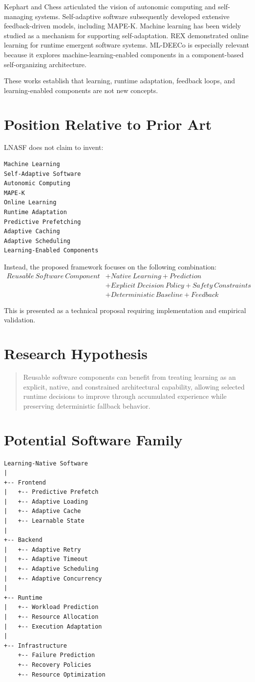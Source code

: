\documentclass[11pt,a4paper]{article}
\begin{document}
Kephart and Chess articulated the vision of autonomic computing and self-managing systems. Self-adaptive software subsequently developed extensive feedback-driven models, including MAPE-K. Machine learning has been widely studied as a mechanism for supporting self-adaptation. REX demonstrated online learning for runtime emergent software systems. ML-DEECo is especially relevant because it explores machine-learning-enabled components in a component-based self-organizing architecture.

These works establish that learning, runtime adaptation, feedback loops, and learning-enabled components are not new concepts.

\section{Position Relative to Prior Art}
LNASF does not claim to invent:
\begin{lstlisting}
Machine Learning
Self-Adaptive Software
Autonomic Computing
MAPE-K
Online Learning
Runtime Adaptation
Predictive Prefetching
Adaptive Caching
Adaptive Scheduling
Learning-Enabled Components
\end{lstlisting}

Instead, the proposed framework focuses on the following combination:
\[
\begin{aligned}
Reusable\ Software\ Component
&+ Native\ Learning + Prediction\\
&+ Explicit\ Decision\ Policy + Safety\ Constraints\\
&+ Deterministic\ Baseline + Feedback
\end{aligned}
\]

This is presented as a technical proposal requiring implementation and empirical validation.

\section{Research Hypothesis}
\begin{quote}
Reusable software components can benefit from treating learning as an explicit, native, and constrained architectural capability, allowing selected runtime decisions to improve through accumulated experience while preserving deterministic fallback behavior.
\end{quote}

\section{Potential Software Family}
\begin{lstlisting}
Learning-Native Software
|
+-- Frontend
|   +-- Predictive Prefetch
|   +-- Adaptive Loading
|   +-- Adaptive Cache
|   +-- Learnable State
|
+-- Backend
|   +-- Adaptive Retry
|   +-- Adaptive Timeout
|   +-- Adaptive Scheduling
|   +-- Adaptive Concurrency
|
+-- Runtime
|   +-- Workload Prediction
|   +-- Resource Allocation
|   +-- Execution Adaptation
|
+-- Infrastructure
    +-- Failure Prediction
    +-- Recovery Policies
    +-- Resource Optimization
\end{lstlisting}
\end{document}
